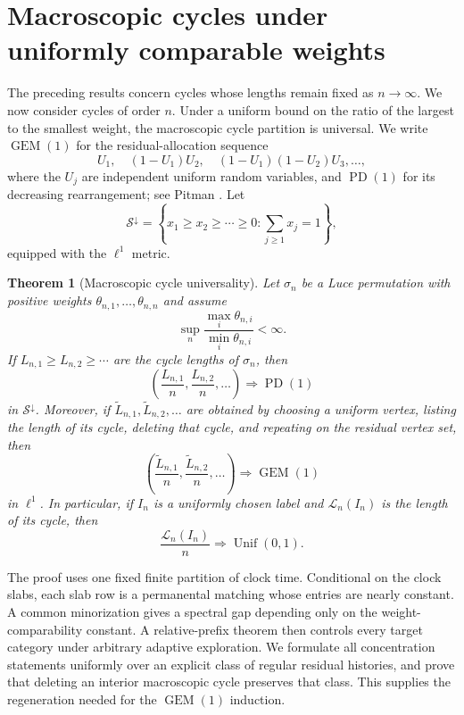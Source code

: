 \documentclass[11pt]{article}
\newtheorem{theorem}{Theorem}[section]
\theoremstyle{remark}
\begin{document}
\section{Macroscopic cycles under uniformly comparable weights}
\label{sec:macroscopic-cycles}

The preceding results concern cycles whose lengths remain fixed as $n\to\infty$.
We now consider cycles of order $n$.  Under a uniform bound on the ratio of the
largest to the smallest weight, the macroscopic cycle partition is universal.
We write $\operatorname{GEM}(1)$ for the residual-allocation sequence
\[
 U_1,\quad (1-U_1)U_2,\quad
 (1-U_1)(1-U_2)U_3,\ldots,
\]
where the $U_j$ are independent uniform random variables, and
$\operatorname{PD}(1)$ for its decreasing rearrangement; see
Pitman \cite[Chapter~3]{Pitman2006}.  Let
\[
 \mathcal S^\downarrow
 =\left\{x_1\ge x_2\ge\cdots\ge0:
 \sum_{j\ge1}x_j=1\right\},
\]
equipped with the $\ell^1$ metric.

\begin{theorem}[Macroscopic cycle universality]
\label{thm:macroscopic-pd}
Let $\sigma_n$ be a Luce permutation with positive weights
$\theta_{n,1},\ldots,\theta_{n,n}$ and assume
\[
 \sup_n\frac{\max_i\theta_{n,i}}{\min_i\theta_{n,i}}<\infty.
\]
If $L_{n,1}\ge L_{n,2}\ge\cdots$ are the cycle lengths of $\sigma_n$, then
\[
 \left(\frac{L_{n,1}}n,\frac{L_{n,2}}n,\ldots\right)
 \Rightarrow\operatorname{PD}(1)
\]
in $\mathcal S^\downarrow$.  Moreover, if
$\widetilde L_{n,1},\widetilde L_{n,2},\ldots$ are obtained by choosing a
uniform vertex, listing the length of its cycle, deleting that cycle, and
repeating on the residual vertex set, then
\[
 \left(\frac{\widetilde L_{n,1}}n,
 \frac{\widetilde L_{n,2}}n,\ldots\right)
 \Rightarrow\operatorname{GEM}(1)
\]
in $\ell^1$.  In particular, if $I_n$ is a uniformly chosen label and
$\mathscr L_n(I_n)$ is the length of its cycle, then
\[
        \frac{\mathscr L_n(I_n)}n\Rightarrow\operatorname{Unif}(0,1).
\]
\end{theorem}

The proof uses one fixed finite partition of clock time.  Conditional on the
clock slabs, each slab row is a permanental matching whose entries are nearly
constant.  A common minorization gives a spectral gap depending only on the
weight-comparability constant.  A relative-prefix theorem then controls every
target category under arbitrary adaptive exploration.  We formulate all
concentration statements uniformly over an explicit class of regular residual
histories, and prove that deleting an interior macroscopic cycle preserves that
class.  This supplies the regeneration needed for the $\operatorname{GEM}(1)$
induction.
\end{document}

